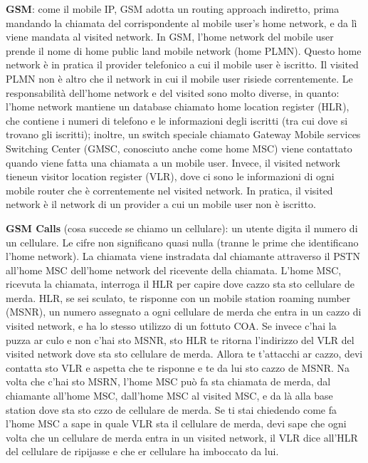\documentclass[a4paper,10pt]{article} %
\renewcommand{\b}[1]{%
    {\textbf{#1}}}
\begin{document}
\b{GSM}: come il mobile IP, GSM adotta un routing approach indiretto, prima mandando la chiamata del corrispondente al mobile user's home network, e da lì viene mandata al visited network. In GSM, l'home network del mobile user prende il nome di home public land mobile network (home PLMN). Questo home network è in pratica il provider telefonico a cui il mobile user è iscritto. Il visited PLMN non è altro che il network in cui il mobile user risiede correntemente. Le responsabilità dell'home network e del visited sono molto diverse, in quanto: l'home network mantiene un database chiamato home location register (HLR), che contiene i numeri di telefono e le informazioni degli iscritti (tra cui dove si trovano gli iscritti); inoltre, un switch speciale chiamato Gateway Mobile services Switching Center (GMSC, conosciuto anche come home MSC) viene contattato quando viene fatta una chiamata a un mobile user. Invece, il visited network tieneun visitor location register (VLR), dove ci sono le informazioni di ogni mobile router che è correntemente nel visited network. In pratica, il visited network è il network di un provider a cui un mobile user non è iscritto.

\b{GSM Calls} (cosa succede se chiamo un cellulare): un utente digita il numero di un cellulare. Le cifre non significano quasi nulla (tranne le prime che identificano l'home network). La chiamata viene instradata dal chiamante attraverso il PSTN all'home MSC dell'home network del ricevente della chiamata. L'home MSC, ricevuta la chiamata, interroga il HLR per capire dove cazzo sta sto cellulare de merda. HLR, se sei sculato, te risponne con un mobile station roaming number (MSNR), un numero assegnato a ogni cellulare de merda che entra in un cazzo di visited network, e ha lo stesso utilizzo di un fottuto COA. Se invece c'hai la puzza ar culo e non c'hai sto MSNR, sto HLR te ritorna l'indirizzo del VLR del visited network dove sta sto cellulare de merda. Allora te t'attacchi ar cazzo, devi contatta sto VLR e aspetta che te risponne e te da lui sto cazzo de MSNR. Na volta che c'hai sto MSRN, l'home MSC può fa sta chiamata de merda, dal chiamante all'home MSC, dall'home MSC al visited MSC, e da là alla base station dove sta sto czzo de cellulare de merda. Se ti stai chiedendo come fa l'home MSC a sape in quale VLR sta il cellulare de merda, devi sape che ogni volta che un cellulare de merda entra in un visited network, il VLR dice all'HLR del cellulare de ripijasse e che er cellulare ha imboccato da lui.
\end{document}
